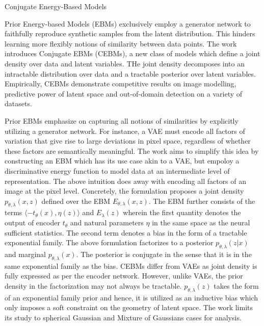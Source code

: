 \documentclass[12pt,letterpaper]{article}
\begin{document}
\begin{center}
  \large{Conjugate Energy-Based Models}
\end{center}

Prior Energy-based Models (EBMs) exclusively employ a generator network to faithfully reproduce synthetic samples from the latent distribution. This hinders learning more flexibly notions of similarity between data points. The work introduces Conjugate EBMs (CEBMs), a new class of models which define a joint density over data and latent variables. THe joint density decomposes into an intractable distribution over data and a tractable posterior over latent variables. Empirically, CEBMs demonstrate competitive results on image modelling, predictive power of latent space and out-of-domain detection on a variety of datasets.

Prior EBMs emphasize on capturing all notions of similarities by explicitly utilizing a generator network. For instance, a VAE must encode all factors of variation that give rise to large deviations in pixel space, regardless of whether these factors are semantically meaningful. The work aims to simplify this idea by constructing an EBM which has its use case akin to a VAE, but empoloy a discriminative energy function to model data at an intermediate level of representation. The above intuition does away with encoding all factors of an image at the pixel level. Concretely, the formulation proposes a joint density $p_{\theta,\lambda}(x,z)$ defined over the EBM $E_{\theta,\lambda}(x,z)$. The EBM further consists of the terms $\langle-t_{\theta}(x),\eta(z)\rangle$ and $E_{\lambda}(z)$ wherein the first quantity denotes the output of encoder $t_{\theta}$ and natural parameters $\eta$ in the same space as the neural sufficient statistics. The second term denotes a bias in the form of a tractable exponential family. The above formulation factorizes to a posterior $p_{\theta,\lambda}(z|x)$ and marginal $p_{\theta,\lambda}(x)$. The posterior is conjugate in the sense that it is in the same exponential family as the bias. CEBMs differ from VAEs as joint density is fully expressed as per the encoder network. However, unlike VAEs, the prior density in the factorization may not always be tractable. $p_{\theta,\lambda}(z)$ takes the form of an exponential family prior and hence, it is utilized as an inductive bias which only imposes a soft constraint on the geometry of latent space. The work limits its study to spherical Gaussian and Mixture of Gaussians cases for analysis.
\end{document}
